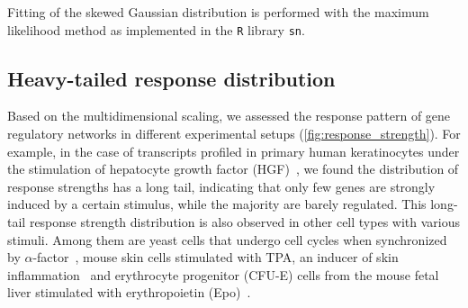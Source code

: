 Fitting of the skewed Gaussian distribution is performed with
the maximum likelihood method as implemented in the 
\texttt{R}
library \texttt{sn}.

\subsection{Heavy-tailed response distribution}
Based on the multidimensional scaling, we assessed
the response pattern of gene regulatory networks in different
experimental setups (\ref{fig:response_strength}). 
For example, in the case of transcripts
profiled in primary human keratinocytes under the stimulation of 
hepatocyte growth factor (HGF)~\citep{Busch2008}, we found the distribution of response
strengths has a long tail, indicating that 
only few genes are strongly induced by a certain stimulus, while the majority 
are barely regulated. This long-tail response strength
distribution is also observed in other cell types with various stimuli.
Among them are yeast cells that undergo cell cycles when synchronized by 
$\alpha$-factor~\citep{Spellman1998,Cho1998}, mouse skin cells stimulated with TPA,
an inducer of skin inflammation~\citep{Riehl2010} and erythrocyte progenitor
(CFU-E) cells from the mouse fetal liver stimulated with erythropoietin (Epo)~\citep{Bachmann2011}. 

